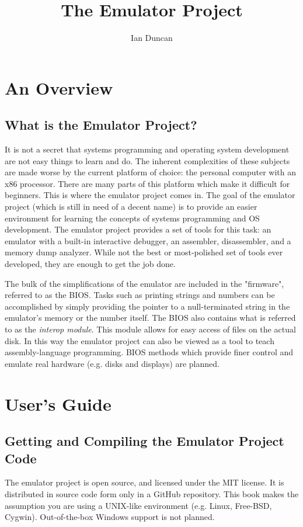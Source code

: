 \documentclass[12pt,letterpaper,titlepage,twoside]{book}
\author{Ian Duncan}
\title{The Emulator Project}
\begin{document}
\maketitle
\newpage
\chapter{An Overview}
\section{What is the Emulator Project?}
It is not a secret that systems programming and operating system development are not easy things to learn and do. The inherent complexities of these subjects are made worse by the current platform of choice: the personal computer with an x86 processor. There are many parts of this platform which make it difficult for beginners. This is where the emulator project comes in. The goal of the emulator project (which is still in need of a decent name) is to provide an easier environment for learning the concepts of systems programming and OS development. The emulator project provides a set of tools for this task: an emulator with a built-in interactive debugger, an assembler, disassembler, and a memory dump analyzer. While not the best or most-polished set of tools ever developed, they are enough to get the job done.

The bulk of the simplifications of the emulator are included in the "firmware", referred to as the BIOS. Tasks such as printing strings and numbers can be accomplished by simply providing the pointer to a null-terminated string in the emulator's memory or the number itself. The BIOS also contains what is referred to as the \textit{interop module}. This module allows for easy access of files on the actual disk. In this way the emulator project can also be viewed as a tool to teach assembly-language programming. BIOS methods which provide finer control and emulate real hardware (e.g. disks and displays) are planned.
\chapter{User's Guide}
\section{Getting and Compiling the Emulator Project Code}
The emulator project is open source, and licensed under the MIT license. It is distributed in source code form only in a GitHub repository. This book makes the assumption you are using a UNIX-like environment (e.g. Linux, Free-BSD, Cygwin). Out-of-the-box Windows support is not planned.
\end{document}

